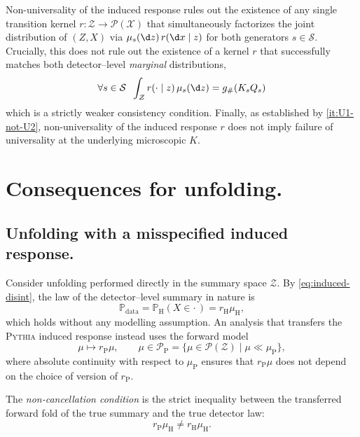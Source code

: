 \documentclass[12pt]{article}
\newcommand{\Herwig}{\mathrm{H}}
\newcommand{\Pythia}{\mathrm{P}}
\newcommand{\Prb}{\mathbb{P}}
\newcommand{\Gens}{\mathcal{S}}
\newcommand{\Meas}{\mathcal{P}}
\newcommand{\1}{\mathbbm{1}}
\newcommand{\pushf}[1]{#1_{\#}}
\renewcommand{\[}{\begin{equation}}
\renewcommand{\]}{\end{equation}}
\begin{document}
    \begin{remark}
    \noproofref
    \label{rem:scope}
        Non-universality of the induced response rules out the existence of any single transition kernel \(r : \mathcal{Z} \to \Meas(\mathcal{X})\) that simultaneously factorizes the joint distribution of \((Z, X)\) via \(\mu_s(\d z)\,r(\d x \mid z)\) for both generators \(s \in \Gens\).
        Crucially, this does not rule out the existence of a kernel \(r\) that successfully matches both detector--level \emph{marginal} distributions,
        \[
            \forall s \in \Gens \;\; \int_{\mathcal{Z}} r(\cdot \mid z)\,\mu_s(\d z) = \pushf{g}(K_s Q_s)
        \]
        which is a strictly weaker consistency condition.
        Finally, as established by \cref{it:U1-not-U2}, non-universality of the induced response \(r\) does not imply failure of universality at the underlying microscopic \(K\).
    \end{remark}

\section{Consequences for unfolding.}
\label{sec:unfolding}

    \subsection{Unfolding with a misspecified induced response.}

    Consider unfolding performed directly in the summary space \(\mathcal Z\).
    By \cref{eq:induced-disint}, the law of the detector--level summary in nature is
    \[
    \label{eq:nature-forward}
        \Prb_{\mathrm{data}} = \Prb_\Herwig ( X \in \cdot \, ) = r_\Herwig \mu_\Herwig,
    \]
    which holds without any modelling assumption.
    An analysis that transfers the \textsc{Pythia} induced response instead uses the forward model
    \[
    \label{eq:pythia-forward}
        \mu \mapsto r_\Pythia \mu,\qquad \mu \in \Meas_\Pythia = \{ \mu \in \Meas( \mathcal Z ) \mid \mu \ll \mu_\Pythia \},
    \]
    where absolute continuity with respect to \(\mu_\Pythia\) ensures that \( r_\Pythia \mu \) does not depend on the choice of version of \( r_\Pythia \).

    \begin{definition}
    \label{def:noncancellation}
        The \emph{non-cancellation condition} is the strict inequality between the transferred forward fold of the true summary and the true detector law:
        \[
        \label{eq:noncancellation}
            r_\Pythia\mu_\Herwig \ne r_\Herwig\mu_\Herwig.
        \]
    \end{definition}
    
\end{document}
